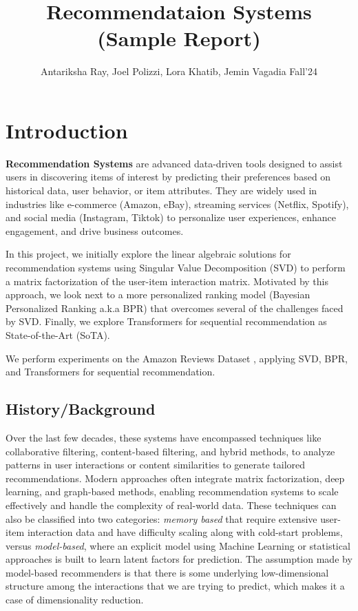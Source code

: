 \documentclass{article}
\title{Recommendataion Systems (Sample Report)}
\author{%
  Antariksha Ray, Joel Polizzi, Lora Khatib, Jemin Vagadia Fall'24
}
\begin{document}
\maketitle

\section{Introduction}
\textbf{Recommendation Systems} are advanced data-driven tools designed to assist users in discovering items of interest by predicting their preferences based on historical data, user behavior, or item attributes. They are widely used in industries like e-commerce (Amazon, eBay), streaming services (Netflix, Spotify), and social media (Instagram, Tiktok) to personalize user experiences, enhance engagement, and drive business outcomes.

In this project, we initially explore the linear algebraic solutions for recommendation systems using Singular Value Decomposition (SVD) to perform a matrix factorization of the user-item interaction matrix. Motivated by this approach, we look next to a more personalized ranking model (Bayesian Personalized Ranking a.k.a BPR) \cite{bpr} that overcomes several of the challenges faced by SVD. Finally, we explore Transformers for sequential recommendation as State-of-the-Art (SoTA).

We perform experiments on the Amazon Reviews Dataset \cite{hou2024bridginglanguageitemsretrieval}, applying SVD, BPR, and Transformers for sequential recommendation.


\subsection{History/Background}
Over the last few decades, these systems have encompassed techniques like collaborative filtering, content-based filtering, and hybrid methods, to analyze patterns in user interactions or content similarities to generate tailored recommendations. Modern approaches often integrate matrix factorization, deep learning, and graph-based methods, enabling recommendation systems to scale effectively and handle the complexity of real-world data. These techniques can also be classified into two categories: \textit{memory based} that require extensive user-item interaction data and have difficulty scaling along with cold-start problems, versus \textit{model-based}, where an explicit model using Machine Learning or statistical approaches is built to learn latent factors for prediction. The assumption made by model-based recommenders is that there is some underlying low-dimensional structure among the interactions that we are trying to predict, which makes it a case of dimensionality reduction.
\end{document}
